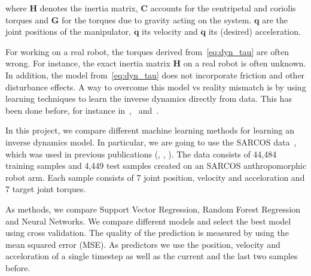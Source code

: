\documentclass[letterpaper, 10 pt, conference]{ieeeconf}  %
\renewcommand{\b}[1]{\bm{#1}}
\begin{document}
where $\b{H}$ denotes the inertia matrix, $\b{C}$ accounts for the centripetal and coriolis torques and $\b{G}$ for the torques due to gravity acting on the system. $\b{q}$ are the joint positions of the manipulator, $\dot{\b{q}}$ its velocity and $\ddot{\b{q}}$ its (desired) acceleration.

For working on a real robot, the torques derived from~\cref{eq:dyn_tau} are often wrong. For instance, the exact inertia matrix $\b{H}$ on a real robot is often unknown. In addition, the model from~\cref{eq:dyn_tau} does not incorporate friction and other disturbance effects. A way to overcome this model vs reality mismatch is by using learning techniques to learn the inverse dynamics directly from data. This has been done before, for instance in~\cite{slotine1987adaptive},~\cite{ratliff2016doomed} and~\cite{meier2016towards}.

In this project, we compare different machine learning methods for learning an inverse dynamics model. In particular, we are going to use the SARCOS data~\cite{SARCOS_data}, which was used in previous publications (\cite{vijayakumar2000lwpr}, \cite{vijayakumar2002statistical}, \cite{vijayakumar2005incremental}). The data consists of 44,484 training samples and 4,449 test samples created on an SARCOS anthropomorphic robot arm. Each sample consists of 7 joint position, velocity and acceloration and 7 target joint torques.

As methods, we compare Support Vector Regression, Random Forest Regression and Neural Networks. We compare different models and select the best model using cross validation. The quality of the prediction is measured by using the mean squared error (MSE). As predictors we use the position, velocity and acceloration of a single timestep as well as the current and the last two samples before.



{}
\end{document}
